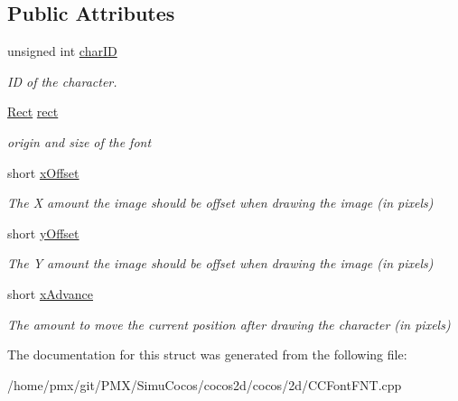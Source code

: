\subsection*{Public Attributes}
\begin{DoxyCompactItemize}
\item 
unsigned int \hyperlink{group__label_ga4be84ef9be4446878fff255b15e9e678}{char\+ID}
\begin{DoxyCompactList}\small\item\em ID of the character. \end{DoxyCompactList}\item 
\hyperlink{classRect}{Rect} \hyperlink{group__label_ga9426c06ddd57097582d48bfb34ef02fa}{rect}
\begin{DoxyCompactList}\small\item\em origin and size of the font \end{DoxyCompactList}\item 
short \hyperlink{group__label_gaf961a67faba7abff4c31ef69b32eaed4}{x\+Offset}
\begin{DoxyCompactList}\small\item\em The X amount the image should be offset when drawing the image (in pixels) \end{DoxyCompactList}\item 
short \hyperlink{group__label_gae0d9c0fc84b157abd9133b6bcddab2b7}{y\+Offset}
\begin{DoxyCompactList}\small\item\em The Y amount the image should be offset when drawing the image (in pixels) \end{DoxyCompactList}\item 
short \hyperlink{group__label_gaf8a9e2733f5f1fcb8a3631b3886d6703}{x\+Advance}
\begin{DoxyCompactList}\small\item\em The amount to move the current position after drawing the character (in pixels) \end{DoxyCompactList}\end{DoxyCompactItemize}


The documentation for this struct was generated from the following file\+:\begin{DoxyCompactItemize}
\item 
/home/pmx/git/\+P\+M\+X/\+Simu\+Cocos/cocos2d/cocos/2d/C\+C\+Font\+F\+N\+T.\+cpp\end{DoxyCompactItemize}
